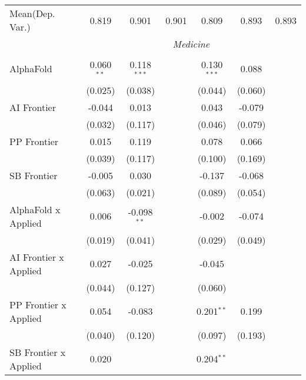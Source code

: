 \begin{tabular}{lcccccc}
Mean(Dep. Var.) & 0.819 & 0.901 & 0.901 & 0.809 & 0.893 & 0.893 \\
 & \multicolumn{6}{c}{\textit{Medicine}} \\ \\
   AlphaFold                      & 0.060$^{**}$ & 0.118$^{***}$ &                & 0.130$^{***}$ & 0.088   &   \\   
                                  & (0.025)      & (0.038)       &                & (0.044)       & (0.060) &   \\   
   AI Frontier                    & -0.044       & 0.013         &                & 0.043         & -0.079  &   \\   
                                  & (0.032)      & (0.117)       &                & (0.046)       & (0.079) &   \\   
   PP Frontier                    & 0.015        & 0.119         &                & 0.078         & 0.066   &   \\   
                                  & (0.039)      & (0.117)       &                & (0.100)       & (0.169) &   \\   
   SB Frontier                    & -0.005       & 0.030         &                & -0.137        & -0.068  &   \\   
                                  & (0.063)      & (0.021)       &                & (0.089)       & (0.054) &   \\   
   AlphaFold x Applied            & 0.006        & -0.098$^{**}$ &                & -0.002        & -0.074  &   \\   
                                  & (0.019)      & (0.041)       &                & (0.029)       & (0.049) &   \\   
   AI Frontier x Applied          & 0.027        & -0.025        &                & -0.045        &         &   \\   
                                  & (0.044)      & (0.127)       &                & (0.060)       &         &   \\   
   PP Frontier x Applied          & 0.054        & -0.083        &                & 0.201$^{**}$  & 0.199   &   \\   
                                  & (0.040)      & (0.120)       &                & (0.097)       & (0.193) &   \\   
   SB Frontier x Applied          & 0.020        &               &                & 0.204$^{**}$  &         &   \\   

\end{tabular}
